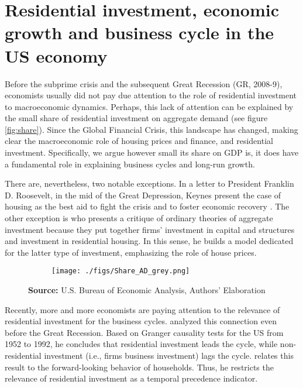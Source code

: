 \documentclass[12pt, a4paper]{article}
\begin{document}
\section{Residential investment, economic growth and business cycle in the US economy}
\label{sec:org2fc9861}
\label{sec:Stylized_Facts}
Before the subprime crisis and the subsequent Great Recession (GR, 2008-9), economists usually did not pay due attention to the role of residential investment to macroeconomic dynamics.
Perhaps, this lack of attention can be explained by the small share of residential investment on aggregate demand (see figure \ref{fig:share}).
Since the Global Financial Crisis, this landscape has changed, making clear the macroeconomic role of housing prices and finance, and residential investment.
Specifically, we argue however small its share on GDP is, it does have a fundamental role in explaining business cycles and long-run growth.

There are, nevertheless, two notable exceptions. In a letter to President Franklin D. Roosevelt, in the mid of the Great Depression, Keynes present the case of housing as the best aid to fight the crisis and to foster economic recovery \cite[p.~436]{keynes_collected_1978}.
The other exception is \textcite{duesenberry_investment_1958} who presents a critique of ordinary theories of aggregate investment because they put together firms’ investment in capital and structures and investment in residential housing.
In this sense, he builds a model dedicated for the latter type of investment, emphasizing the role of house prices.


\begin{figure}[H]
    \centering
	\caption{Expenditures share on GDP}
	\label{fig:share}
\begin{figure}[htb]
    \texttt{[image: ./figs/Share\_AD\_grey.png]}
    \end{figure}
	\caption*{\textbf{Source:} U.S. Bureau of Economic Analysis, Authors' Elaboration}
\end{figure}

Recently, more and more economists are paying attention to the relevance of residential investment for the business cycles.
\textcite{green_follow_1997} analyzed this connection even before the Great Recession.
Based on Granger causality tests for the US from 1952 to 1992, he concludes that residential investment leads the cycle, while non-residential investment (i.e., firms business investment) lags the cycle.
\textcite{green_follow_1997} relates this result to the forward-looking behavior of households.
Thus, he restricts the relevance of residential investment as a temporal precedence indicator.
\end{document}
